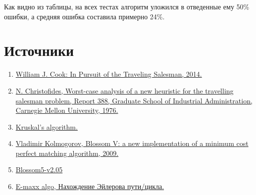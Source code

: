 \documentclass[14pt]{article}
\begin{document}
			Как видно из таблицы, на всех тестах алгоритм уложился в отведенные ему 50\% ошибки, а средняя ошибка составила примерно 24\%.
	
	
	
	
	\section{Источники}
	 	\begin{enumerate}
	 		\item \label{book1} \href{https://press.princeton.edu/titles/9531.html}{William J. Cook: In Pursuit of the Traveling Salesman, 2014.}
	 		\item \label{algoChrist} \href{https://pdfs.semanticscholar.org/afcb/c048ba3265e04b32f92f9ffec0ff4a110aeb.pdf}{ N. Christofides, Worst-case analysis of a new heuristic for the travelling salesman problem, Report 388, Graduate School of Industrial Administration, Carnegie Mellon University, 1976.} 
	 		\item \label{Kruskal} \href{https://en.wikipedia.org/wiki/Kruskal\%27s_algorithm}{Kruskal's algorithm.}
	 		\item \label{kolm} \href{https://link.springer.com/content/pdf/10.1007\%2Fs12532-009-0002-8.pdf}{Vladimir Kolmogorov, Blossom V: a new implementation of a minimum cost perfect matching algorithm, 2009.}
	 		\item \label{realisation} \href{http://pub.ist.ac.at/~vnk/software/blossom5-v2.05.src.tar.gz}{Blossom5-v2.05}
	 		\item \label{euler} \href{http://e-maxx.ru/algo/euler_path}{E-maxx algo, Нахождение Эйлерова пути/цикла.}
	 	\end{enumerate}
	 	
	 
   
\end{document}
